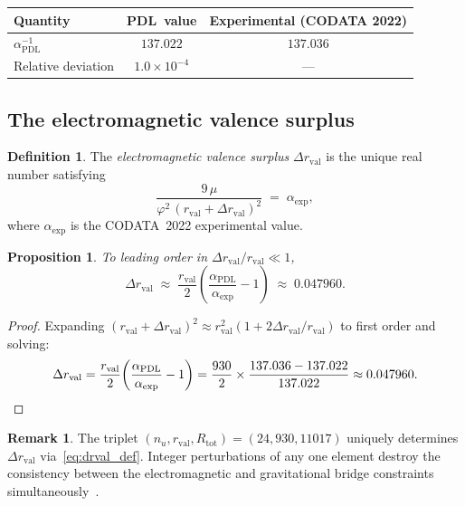 \documentclass[11pt,a4paper]{article}
\newtheorem{proposition}[theorem]{Proposition}
\theoremstyle{definition}
\newtheorem{definition}[theorem]{Definition}
\newtheorem{remark}[theorem]{Remark}
\newcommand{\PDL}{\textnormal{PDL}}
\newcommand{\Rtot}{R_{\mathrm{tot}}}
\newcommand{\rval}{r_{\mathrm{val}}}
\newcommand{\alphaPDL}{\alpha_{\mathrm{PDL}}}
\newcommand{\vp}{\varphi}
\newcommand{\drval}{\Delta r_{\mathrm{val}}}
\begin{document}
\begin{center}
\begin{tabular}{lcc}
\toprule
Quantity & \PDL\ value & Experimental (CODATA 2022) \\
\midrule
$\alphaPDL^{-1}$ & $137.022$ & $137.036$ \\
Relative deviation & $1.0 \times 10^{-4}$ & --- \\
\bottomrule
\end{tabular}
\end{center}

\subsection{The electromagnetic valence surplus}
\label{subsec:drval}

\begin{definition}
  \label{def:drval}
  The \emph{electromagnetic valence surplus} $\drval$ is the unique real
  number satisfying
  \begin{equation}
    \label{eq:drval_def}
    \frac{9\,\mu}{\vp^2\,(\rval + \drval)^2} \;=\; \alpha_{\mathrm{exp}},
  \end{equation}
  where $\alpha_{\mathrm{exp}}$ is the CODATA~2022 experimental value.
\end{definition}

\begin{proposition}
  \label{prop:drval_value}
  To leading order in $\drval/\rval \ll 1$,
  \begin{equation}
    \label{eq:drval_approx}
    \drval \;\approx\; \frac{\rval}{2}\!\left(\frac{\alphaPDL}{\alpha_{\mathrm{exp}}} - 1\right)
    \;\approx\; 0.047960.
  \end{equation}
\end{proposition}

\begin{proof}
  Expanding $(\rval + \drval)^2 \approx \rval^2(1 + 2\drval/\rval)$ to first
  order and solving:
  \[
    \drval = \frac{\rval}{2}\!\left(\frac{\alphaPDL}{\alpha_{\mathrm{exp}}} - 1\right)
           = \frac{930}{2} \times \frac{137.036 - 137.022}{137.022}
           \approx 0.047960. \qedhere
  \]
\end{proof}

\begin{remark}
  \label{rem:drval_uniqueness}
  The triplet $(n_u, \rval, \Rtot) = (24, 930, 11017)$ uniquely determines $\drval$ via~\eqref{eq:drval_def}. Integer perturbations of any one element destroy the consistency between the electromagnetic and gravitational bridge constraints simultaneously~\cite{Bridge_Formula_PDL_2026}.
\end{remark}
\end{document}
